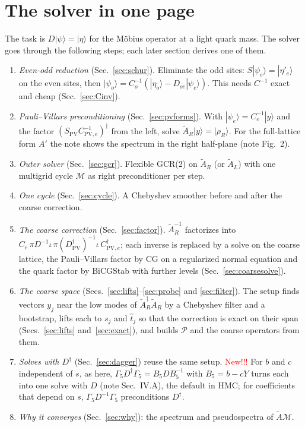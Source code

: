 \documentclass[11pt,a4paper]{article}
\numberwithin{equation}{section}
\newcommand{\dg}{^{\dagger}}
\newcommand{\Dpv}{D_{\mathrm{PV}}}
\newcommand{\Spv}{S_{\mathrm{PV}}}
\newcommand{\Gfive}{\Gamma_5}
\newcommand{\AR}{\tilde A_{R}}
\newcommand{\AL}{\tilde A_{L}}
\newcommand{\Pro}{\mathcal P}
\newcommand{\Ce}{C_{e}}
\newcommand{\Co}{C_{o}}
\newcommand{\Cpve}{C_{\mathrm{PV},e}}
\begin{document}
\section*{The solver in one page}
The task is $D|\psi\rangle=|\eta\rangle$ for the M\"obius operator at a light quark mass. The solver goes through
the following steps; each later section derives one of them.
\begin{enumerate}
\item \emph{Even-odd reduction} (Sec.~\ref{sec:schur}). Eliminate the odd sites:
$S|\psi_e\rangle=|\eta'_e\rangle$ on the even sites, then
$|\psi_o\rangle=\Co^{-1}(|\eta_o\rangle-D_{oe}|\psi_e\rangle)$. This needs
$C^{-1}$ exact and cheap (Sec.~\ref{sec:Cinv}).
\item \emph{Pauli--Villars preconditioning} (Sec.~\ref{sec:pvforms}). With $|\psi_e\rangle=\Ce^{-1}|y\rangle$
and the factor $(\Spv\Cpve^{-1})\dg$ from the left, solve $\AR|y\rangle=|\rho_R\rangle$. For the full-lattice form $A'$ the note
shows the spectrum in the right half-plane (note Fig.~2).
\item \emph{Outer solver} (Sec.~\ref{sec:gcr}). Flexible GCR(2) on $\AR$ (or $\AL$) with one
multigrid cycle $\mathcal M$ as right preconditioner per step.
\item \emph{One cycle} (Sec.~\ref{sec:cycle}). A Chebyshev smoother before and after the coarse
correction.
\item \emph{The coarse correction} (Sec.~\ref{sec:factor}). $\AR^{-1}$ factorizes into
$\Ce\,\pi D^{-1}\iota\,\pi(\Dpv\dg)^{-1}\iota\,\Cpve\dg$; each inverse is replaced by a solve on
the coarse lattice, the Pauli--Villars factor by CG on a regularized normal equation and the quark
factor by BiCGStab with further levels (Sec.~\ref{sec:coarsesolve}).
\item \emph{The coarse space} (Secs.~\ref{sec:lifts}--\ref{sec:probe} and \ref{sec:filter}).
The setup finds vectors $y_j$ near the low modes of $\AR\dg\AR$ by a Chebyshev filter and a
bootstrap, lifts each to $s_j$ and $\hat t_j$ so that the correction is exact on their span
(Secs.~\ref{sec:lifts} and~\ref{sec:exact}), and builds $\Pro$ and the coarse operators from them.
\item \emph{Solves with $D\dg$} (Sec.~\ref{sec:dagger}) reuse the same setup. \textcolor{red}{New!!!} For $b$ and $c$
independent of $s$, as here, $\Gfive D\dg\Gfive=B_5DB_5^{-1}$ with $B_5=b-cY$ turns each into one
solve with $D$ (note Sec.~IV.A), the default in HMC; for coefficients that depend on $s$,
$\Gfive D^{-1}\Gfive$ preconditions $D\dg$.
\item \emph{Why it converges} (Sec.~\ref{sec:why}): the spectrum and pseudospectra of $\tilde A\mathcal M$.
\end{enumerate}
\end{document}
